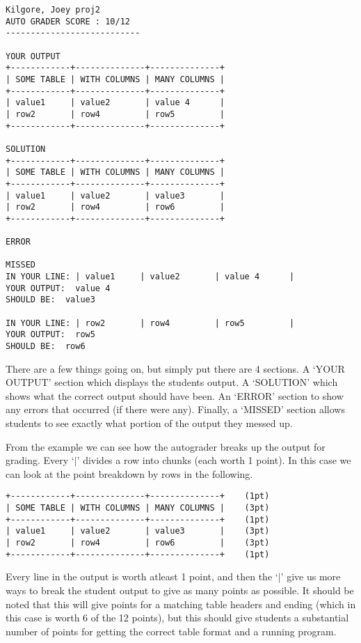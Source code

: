 \documentclass[10pt,a4paper]{book}
\begin{document}
\begin{verbatim}
Kilgore, Joey proj2
AUTO GRADER SCORE : 10/12
---------------------------

YOUR OUTPUT
+------------+--------------+--------------+
| SOME TABLE | WITH COLUMNS | MANY COLUMNS |
+------------+--------------+--------------+
| value1     | value2       | value 4      |
| row2       | row4         | row5         |
+------------+--------------+--------------+

SOLUTION
+------------+--------------+--------------+
| SOME TABLE | WITH COLUMNS | MANY COLUMNS |
+------------+--------------+--------------+
| value1     | value2       | value3       |
| row2       | row4         | row6         |
+------------+--------------+--------------+

ERROR

MISSED
IN YOUR LINE: | value1     | value2       | value 4      |
YOUR OUTPUT:  value 4      
SHOULD BE:  value3       

IN YOUR LINE: | row2       | row4         | row5         |
YOUR OUTPUT:  row5         
SHOULD BE:  row6         
\end{verbatim}

There are a few things going on, but simply put there are 4 sections. A `YOUR OUTPUT' section which displays the students output. A `SOLUTION' which shows what the correct output should have been. An `ERROR' section to show any errors that occurred (if there were any). Finally, a `MISSED' section allows students to see exactly what portion of the output they messed up.

From the example we can see how the autograder breaks up the output for grading. Every `$\vert$' divides a row into chunks (each worth 1 point). In this case we can look at the point breakdown by rows in the following.

\begin{verbatim}
+------------+--------------+--------------+	(1pt)
| SOME TABLE | WITH COLUMNS | MANY COLUMNS |	(3pt)
+------------+--------------+--------------+	(1pt)
| value1     | value2       | value3       |	(3pt)
| row2       | row4         | row6         |	(3pt)
+------------+--------------+--------------+	(1pt)
\end{verbatim}

Every line in the output is worth atleast 1 point, and then the `$\vert$' give us more ways to break the student output to give as many points as possible. It should be noted that this will give points for a matching table headers and ending (which in this case is worth 6 of the 12 points), but this should give students a substantial number of points for getting the correct table format and a running program.
\end{document}
